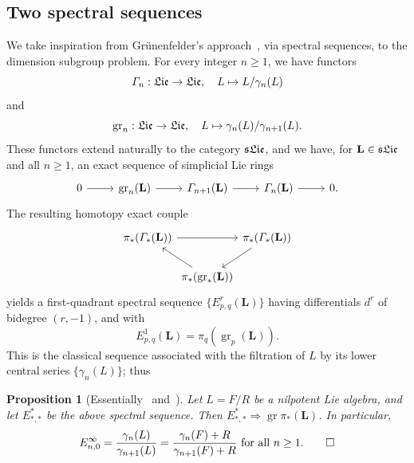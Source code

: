 \documentclass[a4paper,reqno,notitlepage]{amsart}
\newtheorem{prop}[theorem]{Proposition}
\theoremstyle{definition}
\newcommand\gr{\operatorname{gr}}
\begin{document}
\subsection{Two spectral sequences}\label{ss:ss}
We take inspiration from Gr\"unenfelder's
approach~\cite{Gruenenfelder:80}, via spectral sequences, to the
dimension subgroup problem.  For every integer $n\geq 1$, we have
functors
\[\varGamma_n:\mathfrak{Lie}\to \mathfrak{Lie},\quad L\mapsto L/\gamma_n(L)
\]
and
\[\gr_n:\Lie\to\Lie, \quad L\mapsto \gamma_n(L)/\gamma_{n+1}(L).
\]
These functors extend naturally to the category $\mathfrak{sLie}$, and we have,
for $\mathbf L\in \mathfrak{sLie}$ and all $n\geq 1$, an exact sequence of
simplicial Lie rings
\begin{equation}\label{eq:gr_m sequence}
  \begin{tikzcd}0\arrow{r} & \gr_n(\mathbf L)\arrow{r} &
  \varGamma_{n+1}(\mathbf L)\arrow{r} & \varGamma_n(\mathbf L)\arrow{r} & 0.
\end{tikzcd}
\end{equation}
The resulting homotopy exact couple
\[\begin{tikzcd}[column sep=0mm]
  \pi_*(\varGamma_*(\mathbf L))\arrow{rr} &&
  \pi_*(\varGamma_*(\mathbf L))\arrow{dl}\\
  & \pi_*(\gr_*(\mathbf L))\arrow{ul}
\end{tikzcd}
\]
yields a first-quadrant spectral sequence $\{E^r_{p,q}(\mathbf L)\}$
having differentials $d^r$ of bidegree $(r,-1)$, and with
\begin{equation}\label{eq:definition E^1}
  E^1_{p,q}(\mathbf L)=\pi_q(\gr_p(\mathbf L)).
\end{equation}
This is the classical sequence associated with the filtration of $L$
by its lower central series $\{\gamma_n(L)\}$; thus
\begin{prop}[Essentially~\cite{Curtis:71} and~\cite{Gruenenfelder:80}]\label{prop:E^infty}
  Let $L=F/R$ be a nilpotent Lie algebra, and let $E^*_{*,*}$ be the
  above spectral sequence. Then $E^*_{*,*}\Rightarrow\gr\pi_*(\mathbf
  L)$. In particular,
  \[E^\infty_{n,0}=\frac{\gamma_n(L)}{\gamma_{n+1}(L)}=\frac{\gamma_n(F)+R}{\gamma_{n+1}(F)+R}\text{ for all }n\ge1.\qed\]
\end{prop}
\end{document}
